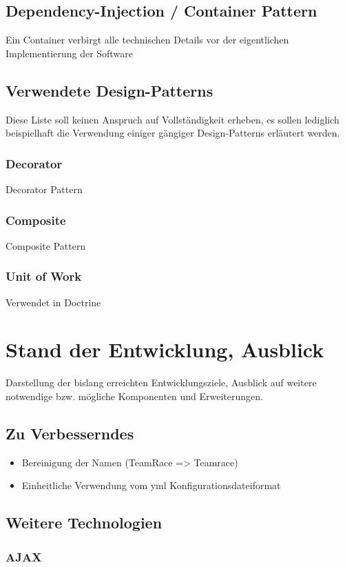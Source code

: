 \documentclass[12pt]{report}
\begin{document}
\section{Dependency-Injection / Container Pattern}
Ein Container verbirgt alle technischen Details vor der eigentlichen Implementierung der Software
\section{Verwendete Design-Patterns}
Diese Liste soll keinen Anspruch auf Vollständigkeit erheben, es sollen lediglich beispielhaft die Verwendung einiger gängiger Design-Patterns erläutert werden.
\subsection{Decorator}
Decorator Pattern
\subsection{Composite}
Composite Pattern
\subsection{Unit of Work}
Verwendet in Doctrine \cite{ab94} 




\chapter{Stand der Entwicklung, Ausblick}
Darstellung der bislang erreichten Entwicklungsziele, Ausblick auf weitere notwendige bzw. mögliche Komponenten und Erweiterungen.
\section{Zu Verbesserndes}

\begin{itemize}
\item{Bereinigung der Namen (TeamRace => Teamrace)}
\item{Einheitliche Verwendung vom yml Konfigurationsdateiformat}
\end{itemize}

\section{Weitere Technologien}

\subsection{AJAX}
\label{sec:AJAX}




\end{document}
